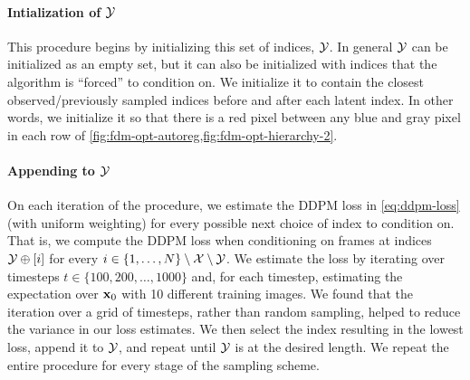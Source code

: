 \paragraph{Intialization of $\mathcal{Y}$}
This procedure begins by initializing this set of indices, $\mathcal{Y}$. In general $\mathcal{Y}$ can be initialized as an empty set, but it can also be initialized with indices that the algorithm is ``forced'' to condition on. We initialize it to contain the closest observed/previously sampled indices before and after each latent index. In other words, we initialize it so that there is a red pixel between any blue and gray pixel in each row of \cref{fig:fdm-opt-autoreg,fig:fdm-opt-hierarchy-2}.

\paragraph{Appending to $\mathcal{Y}$}
On each iteration of the procedure, we estimate the DDPM loss in \cref{eq:ddpm-loss} (with uniform weighting) for every possible next choice of index to condition on. That is, we compute the DDPM loss when conditioning on frames at indices ${\mathcal{Y} \oplus [i]}$ for every ${i\in\{1,\ldots,N\}\setminus\mathcal{X}\setminus\mathcal{Y}}$. We estimate the loss by iterating over timesteps ${t \in \{100,200,\ldots,1000\}}$ and, for each timestep, estimating the expectation over ${\mathbf{x}}_0$ with 10 different training images. We found that the iteration over a grid of timesteps, rather than random sampling, helped to reduce the variance in our loss estimates. We then select the index resulting in the lowest loss, append it to $\mathcal{Y}$, and repeat until $\mathcal{Y}$ is at the desired length. We repeat the entire procedure for every stage of the sampling scheme.

